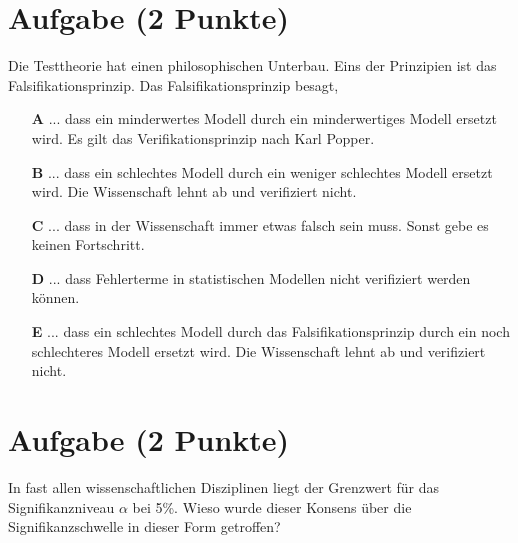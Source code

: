 \documentclass[a4paper, 9pt]{scrartcl}\usepackage[]{graphicx}\usepackage[]{xcolor}
\begin{document}
\section{Aufgabe \hfill (2 Punkte)}



Die Testtheorie hat einen philosophischen Unterbau. Eins der Prinzipien ist das Falsifikationsprinzip. Das Falsifikationsprinzip besagt,



\begin{enumerate}
\item [\textbf{A} \msquare] ... dass ein minderwertes Modell durch ein minderwertiges Modell ersetzt wird. Es gilt das Verifikationsprinzip nach Karl Popper.
\item [\textbf{B} \msquare] ... dass ein schlechtes Modell durch ein weniger schlechtes Modell ersetzt wird. Die Wissenschaft lehnt ab und verifiziert nicht.
\item [\textbf{C} \msquare] ... dass in der Wissenschaft immer etwas falsch sein muss. Sonst gebe es keinen Fortschritt.
\item [\textbf{D} \msquare] ... dass Fehlerterme in statistischen Modellen nicht verifiziert werden können.
\item [\textbf{E} \msquare] ... dass ein schlechtes Modell durch das Falsifikationsprinzip durch ein noch schlechteres Modell ersetzt wird. Die Wissenschaft lehnt ab und verifiziert nicht.
\end{enumerate}

\section{Aufgabe \hfill (2 Punkte)}



In fast allen wissenschaftlichen Disziplinen liegt der Grenzwert für das Signifikanzniveau $\alpha$ bei 5\%. Wieso wurde dieser Konsens über die Signifikanzschwelle in dieser Form getroffen?
\end{document}
